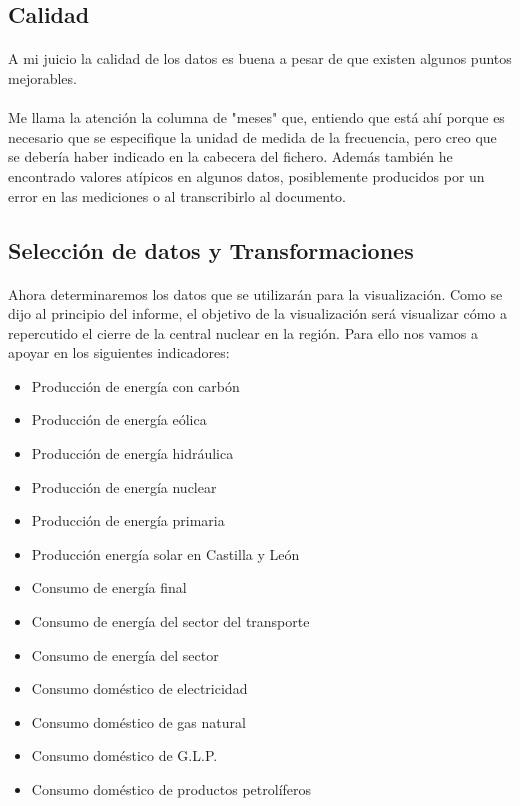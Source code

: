 \documentclass{article}
\begin{document}
		\subsection{Calidad}
		
			\paragraph{}
			A mi juicio la calidad de los datos es buena a pesar de que existen algunos puntos  mejorables.
	
			\paragraph{}
			Me llama la atención la columna de "meses" que, entiendo que está ahí porque es necesario que se especifique la unidad de medida de la frecuencia, pero creo que se debería haber indicado en la cabecera del fichero. Además también he encontrado valores atípicos en algunos datos, posiblemente producidos por un error en las mediciones o al transcribirlo al documento.
			
		\subsection{Selección de datos y Transformaciones}
			
			\paragraph{}
			Ahora determinaremos los datos que se utilizarán para la visualización. Como se dijo al principio del informe, el objetivo de la visualización será visualizar cómo a repercutido el cierre de la central nuclear en la región. Para ello nos vamos a apoyar en los siguientes indicadores:
			
			\begin{itemize}
				\item Producción de energía con carbón
				\item Producción de energía eólica
				\item Producción de energía hidráulica
				\item Producción de energía nuclear
				\item Producción de energía primaria
				\item Producción energía solar en Castilla y León
				\item Consumo de energía final
				\item Consumo de energía del sector del transporte
				\item Consumo de energía del sector
				\item Consumo doméstico de electricidad
				\item Consumo doméstico de gas natural
				\item Consumo doméstico de G.L.P.
				\item Consumo doméstico de productos petrolíferos
			\end{itemize}
			
\end{document}

